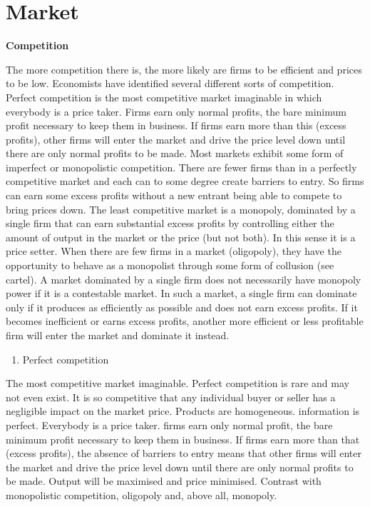 \documentclass[11pt,]{book}
\providecommand{\tightlist}{%
  \setlength{\itemsep}{0pt}\setlength{\parskip}{0pt}}
\theoremstyle{definition}
\theoremstyle{definition}
\theoremstyle{definition}
\theoremstyle{remark}
\begin{document}
\section{Market}\label{market}

\textbf{Competition}

The more competition there is, the more likely are firms to be efficient
and prices to be low. Economists have identified several different sorts
of competition. Perfect competition is the most competitive market
imaginable in which everybody is a price taker. Firms earn only normal
profits, the bare minimum profit necessary to keep them in business. If
firms earn more than this (excess profits), other firms will enter the
market and drive the price level down until there are only normal
profits to be made. Most markets exhibit some form of imperfect or
monopolistic competition. There are fewer firms than in a perfectly
competitive market and each can to some degree create barriers to entry.
So firms can earn some excess profits without a new entrant being able
to compete to bring prices down. The least competitive market is a
monopoly, dominated by a single firm that can earn substantial excess
profits by controlling either the amount of output in the market or the
price (but not both). In this sense it is a price setter. When there are
few firms in a market (oligopoly), they have the opportunity to behave
as a monopolist through some form of collusion (see cartel). A market
dominated by a single firm does not necessarily have monopoly power if
it is a contestable market. In such a market, a single firm can dominate
only if it produces as efficiently as possible and does not earn excess
profits. If it becomes inefficient or earns excess profits, another more
efficient or less profitable firm will enter the market and dominate it
instead.

\begin{enumerate}
\def\labelenumi{\arabic{enumi}.}
\tightlist
\item
  Perfect competition
\end{enumerate}

The most competitive market imaginable. Perfect competition is rare and
may not even exist. It is so competitive that any individual buyer or
seller has a negligible impact on the market price. Products are
homogeneous. information is perfect. Everybody is a price taker. firms
earn only normal profit, the bare minimum profit necessary to keep them
in business. If firms earn more than that (excess profits), the absence
of barriers to entry means that other firms will enter the market and
drive the price level down until there are only normal profits to be
made. Output will be maximised and price minimised. Contrast with
monopolistic competition, oligopoly and, above all, monopoly.
\end{document}

